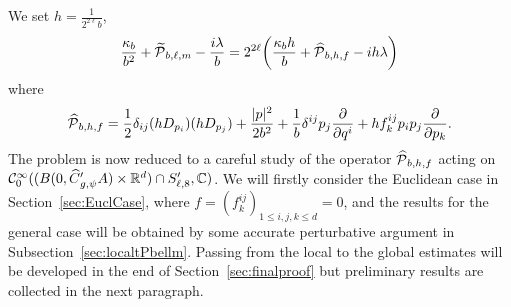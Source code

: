 \documentclass[AHL,Unicode,longabstracts]{cedram}
\newcommand{\C}{\mathbb{C}}
\newcommand{\R}{\mathbb{R}}
\newcommand{\clC}{\mathcal{C}}
\newcommand{\clP}{\mathcal{P}}
\let\oldtilde\tilde
\renewcommand*{\tilde}[1]{\mathchoice{\widetilde{#1}}{\widetilde{#1}}{\oldtilde{#1}}{\oldtilde{#1}}}
\let\oldhat\hat
\renewcommand*{\hat}[1]{\mathchoice{\widehat{#1}}{\widehat{#1}}{\oldhat{#1}}{\oldhat{#1}}}
\let\originalleft\left
\let\originalright\right
\renewcommand{\left}{\mathopen{}\mathclose\bgroup\originalleft}
\renewcommand{\right}{\aftergroup\egroup\originalright}
\begin{document}
We set $h=\frac{1}{2^{2\ell}b}$,
\begin{equation}
\frac{\kappa_{b}}{b^{2}} + \tilde{\clP}_{b,\ell,m} - \frac{i\lambda}{b}= 2^{2\ell}
\left(
\frac{\kappa_{b}h}{b} + \hat{\clP}_{b,h,f} - i h \lambda
\right)
\end{equation}
where
\begin{equation}\label{perturbation_of_Euclidean_KFP}
\hat{\clP}_{b,h,f} = \frac{1}{2}\delta_{ij}(hD_{p_{i}})(hD_{p_{j}}) + \frac{|p|^2}{2b^2} + \frac{1}{b}\delta^{ij}p_{j}\frac{\partial}{\partial q^{i}} + hf^{ij}_{k} p_{i}p_{j}\frac{\partial}{\partial p_{k}}.
\end{equation}
The problem is now reduced to a careful study of the operator $\hat{ \clP}_{b,h,f}$ acting on $\clC^\infty_0((B(0,\hat{C}'_{g,\psi}A)\times \R^d)\cap S_{\ell,8}',\C)$. We will firstly consider the Euclidean case in Section~\ref{sec:EuclCase}, where $f=(f^{ij}_k)_{1\leq i,j,k \leq d}=0$, and the results for the general case will be obtained by some accurate perturbative argument in Subsection~\ref{sec:localtPbellm}. Passing from the local to the global estimates will be developed in the end of Section~\ref{sec:finalproof} but preliminary results are collected in the next paragraph.
\end{document}
